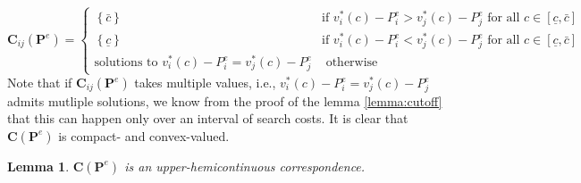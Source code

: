 \documentclass[14pt]{article}
\theoremstyle{plain}
\newtheorem{lemma}[thm]{Lemma}
\theoremstyle{definition}
\theoremstyle{remark}
\DeclareRobustCommand\1{\futurelet\oneNext\oneCheck}
\begin{document}
\begin{equation*}
\mathbf{C}_{ij}\left( \mathbf{P}^{e}\right) =\left\{ 
\begin{array}{cc}
\left\{ \bar{c}\right\}  & \text{if }v_{i}^{\ast }\left( c\right)
-P_{i}^{e}>v_{j}^{\ast }\left( c\right) -P_{j}^{e}\text{ for all }c\in \left[
\underline{c},\bar{c}\right] \\ 
\left\{ \underline{c}\right\}  & \text{if }v_{i}^{\ast }\left( c\right)
-P_{i}^{e}<v_{j}^{\ast }\left( c\right) -P_{j}^{e}\text{ for all }c\in \left[
\underline{c},\bar{c}\right] \\ 
\text{solutions to }v_{i}^{\ast }\left( c\right) -P_{i}^{e}=v_{j}^{\ast
}\left( c\right) -P_{j}^{e} & \text{ otherwise}%
\end{array}%
\right. 
\end{equation*}%
Note that if $\mathbf{C}_{ij}\left( \mathbf{P}^{e}\right) $ takes multiple
values, i.e., $v_{i}^{\ast }\left( c\right) -P_{i}^{e}=v_{j}^{\ast }\left(
c\right) -P_{j}^{e}$ admits mutliple solutions, we know from the proof of
the lemma \ref{lemma:cutoff} that this can happen only over an interval of search costs. It is clear that $\mathbf{C}\left( \mathbf{P}^{e}\right) $ is compact- and convex-valued.

\begin{lemma}
$\mathbf{C}\left( \mathbf{P}^{e}\right) $ is an upper-hemicontinuous
correspondence.
\end{lemma}
\end{document}
